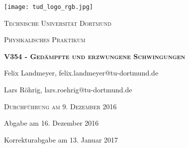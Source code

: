 \documentclass[bibliography=totoc]{scrartcl}
\begin{document}
\begin{titlepage}
  \centering
  \texttt{[image: tud\_logo\_rgb.jpg]}\par\vspace{2cm}
  {\scshape\LARGE Technische Universität Dortmund \par}
  \vspace{1.5cm}
  {\scshape\Large Physikalisches Praktikum\par}
  \vspace{1.5cm}
  {\scshape\LARGE\bfseries V354 - Gedämpfte und erzwungene Schwingungen\par}
  \vspace{2.5cm}
  {\Large Felix Landmeyer, felix.landmeyer@tu-dortmund.de \par\vspace{0.25cm}
    Lars Röhrig, lars.roehrig@tu-dortmund.de\par}
  \vspace{2cm}
  {\scshape Durchführung am 9. Dezember 2016 \par
    Abgabe am 16. Dezember 2016\par
    Korrekturabgabe am 13. Januar 2017}
\end{titlepage}

  \tableofcontents
  \newpage
  
  
  
  
  
  \printbibliography
\end{document}
